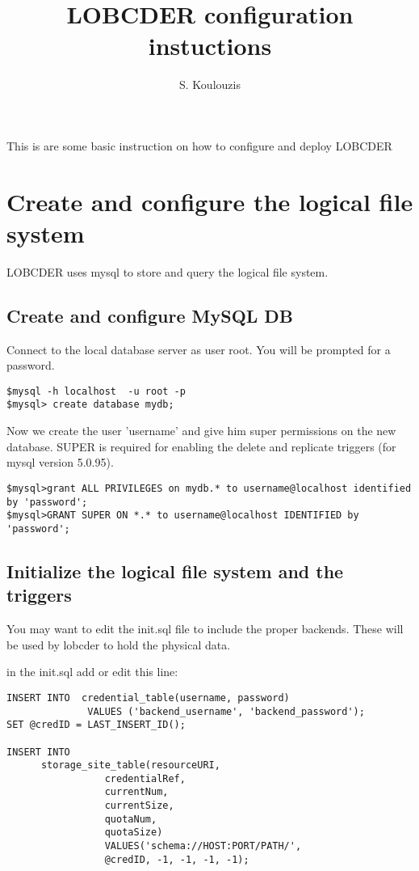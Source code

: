 \documentclass[a4paper,10pt]{article}
\title{LOBCDER configuration instuctions}
\author{S. Koulouzis}
\date{}
\begin{document}
\maketitle
This is are some basic instruction on how to configure and deploy LOBCDER 

\section{Create and configure the logical file system}
LOBCDER uses mysql to store and query the logical file system.

\subsection{Create and configure MySQL DB}
Connect to the local database server as user root. You will be prompted for a password.

\begin{lstlisting}
$mysql -h localhost  -u root -p
$mysql> create database mydb;
\end{lstlisting}


Now we create the user 'username' and give him super permissions on the new database. SUPER is required for enabling the delete and replicate triggers (for mysql version 5.0.95). 
\begin{lstlisting}
$mysql>grant ALL PRIVILEGES on mydb.* to username@localhost identified by 'password';
$mysql>GRANT SUPER ON *.* to username@localhost IDENTIFIED by 'password';
\end{lstlisting}


\subsection{Initialize the logical file system and the triggers}
You may want to edit the init.sql file to include the proper backends. These will be used by lobcder to hold the physical data.

in the init.sql add or edit this line: 

\begin{lstlisting}
INSERT INTO  credential_table(username, password) 
			  VALUES ('backend_username', 'backend_password');
SET @credID = LAST_INSERT_ID();

INSERT INTO 
	  storage_site_table(resourceURI, 
			     credentialRef, 
			     currentNum, 
			     currentSize, 
			     quotaNum, 
			     quotaSize)
			     VALUES('schema://HOST:PORT/PATH/', 
			     @credID, -1, -1, -1, -1);
\end{lstlisting}
\end{document}
